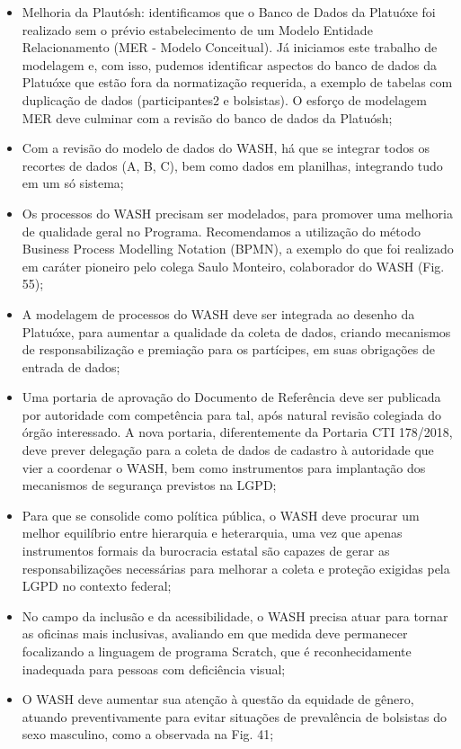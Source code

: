 \begin{itemize}
\item Melhoria da Plautósh: identificamos que o Banco de Dados da Platuóxe foi realizado sem o prévio estabelecimento de um Modelo Entidade Relacionamento (MER - Modelo Conceitual). Já iniciamos este trabalho de modelagem e, com isso, pudemos identificar aspectos do banco de dados da Platuóxe que estão fora da normatização requerida, a exemplo de tabelas com duplicação de dados (participantes2 e bolsistas). O esforço de modelagem MER deve culminar com a revisão do banco de dados da Platuósh;
\item Com a revisão do modelo de dados do WASH, há que se integrar todos os recortes de dados (A, B, C), bem como dados em planilhas, integrando tudo em um só sistema;
\item Os processos do WASH precisam ser modelados, para promover uma melhoria de qualidade geral no Programa. Recomendamos a utilização do método Business Process Modelling Notation (BPMN), a exemplo do que foi realizado em caráter pioneiro pelo colega Saulo Monteiro, colaborador do WASH (Fig. 55);
\item A modelagem de processos do WASH deve ser integrada ao desenho da Platuóxe, para aumentar a qualidade da coleta de dados, criando mecanismos de responsabilização e premiação para os partícipes, em suas obrigações de entrada de dados;
\item Uma portaria de aprovação do Documento de Referência deve ser publicada por autoridade com competência para tal, após natural revisão colegiada do órgão interessado. A nova portaria, diferentemente da Portaria CTI 178/2018, deve prever delegação para a coleta de dados de cadastro à autoridade que vier a coordenar o WASH, bem como instrumentos para implantação dos mecanismos de segurança previstos na LGPD;
\item Para que se consolide como política pública, o WASH deve procurar um melhor equilíbrio entre hierarquia e heterarquia, uma vez que apenas instrumentos formais da burocracia estatal são capazes de gerar as responsabilizações necessárias para melhorar a coleta e proteção exigidas pela LGPD no contexto federal;
\item No campo da inclusão e da acessibilidade, o WASH precisa atuar para tornar as oficinas mais inclusivas, avaliando em que medida deve permanecer focalizando a linguagem de programa Scratch, que é reconhecidamente inadequada para pessoas com deficiência visual;
\item O WASH deve aumentar sua atenção à questão da equidade de gênero, atuando preventivamente para evitar situações de prevalência de bolsistas do sexo masculino, como a observada na Fig. 41;

\end{itemize}
